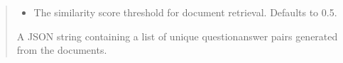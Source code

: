 \documentclass[letterpaper,10pt,english,openany,oneside]{sphinxmanual}
\begin{document}
\begin{fulllineitems}
\begin{quote}
\begin{description}
\begin{itemize}
\item {} 
\sphinxAtStartPar
{} \textendash{} The similarity score threshold for document retrieval. Defaults to 0.5.

\end{itemize}

\sphinxAtStartPar
A JSON string containing a list of unique question\sphinxhyphen{}answer pairs generated from the documents.

\end{description}\end{quote}

\end{fulllineitems}

\end{document}
